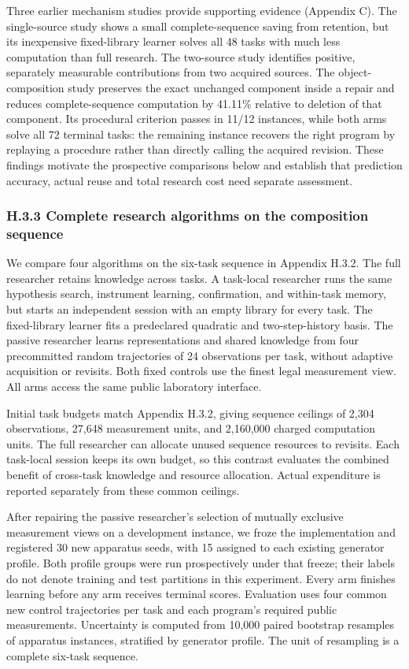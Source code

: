 \documentclass[11pt,a4paper]{article}
\begin{document}
Three earlier mechanism studies provide supporting evidence (Appendix C). The single-source study shows a small complete-sequence saving from retention, but its inexpensive fixed-library learner solves all 48 tasks with much less computation than full research. The two-source study identifies positive, separately measurable contributions from two acquired sources. The object-composition study preserves the exact unchanged component inside a repair and reduces complete-sequence computation by 41.11\% relative to deletion of that component. Its procedural criterion passes in 11/12 instances, while both arms solve all 72 terminal tasks: the remaining instance recovers the right program by replaying a procedure rather than directly calling the acquired revision. These findings motivate the prospective comparisons below and establish that prediction accuracy, actual reuse and total research cost need separate assessment.


\subsubsection*{H.3.3 Complete research algorithms on the composition sequence}

We compare four algorithms on the six-task sequence in Appendix H.3.2. The full researcher retains knowledge across tasks. A task-local researcher runs the same hypothesis search, instrument learning, confirmation, and within-task memory, but starts an independent session with an empty library for every task. The fixed-library learner fits a predeclared quadratic and two-step-history basis. The passive researcher learns representations and shared knowledge from four precommitted random trajectories of 24 observations per task, without adaptive acquisition or revisits. Both fixed controls use the finest legal measurement view. All arms access the same public laboratory interface.


Initial task budgets match Appendix H.3.2, giving sequence ceilings of 2,304 observations, 27,648 measurement units, and 2,160,000 charged computation units. The full researcher can allocate unused sequence resources to revisits. Each task-local session keeps its own budget, so this contrast evaluates the combined benefit of cross-task knowledge and resource allocation. Actual expenditure is reported separately from these common ceilings.


After repairing the passive researcher's selection of mutually exclusive measurement views on a development instance, we froze the implementation and registered 30 new apparatus seeds, with 15 assigned to each existing generator profile. Both profile groups were run prospectively under that freeze; their labels do not denote training and test partitions in this experiment. Every arm finishes learning before any arm receives terminal scores. Evaluation uses four common new control trajectories per task and each program's required public measurements. Uncertainty is computed from 10,000 paired bootstrap resamples of apparatus instances, stratified by generator profile. The unit of resampling is a complete six-task sequence.
\end{document}
